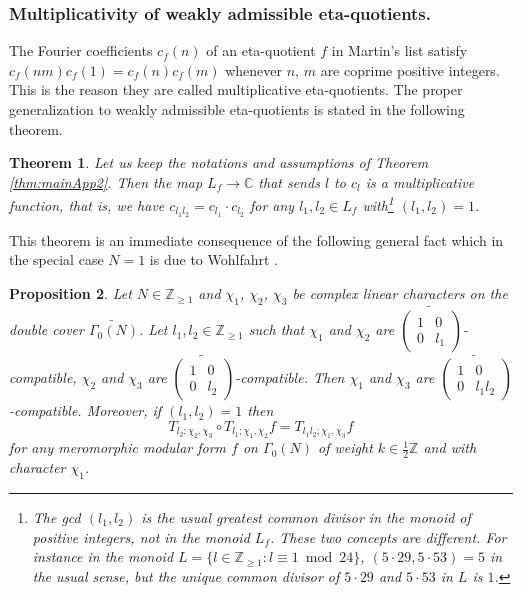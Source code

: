 \documentclass[12pt]{amsart}
\numberwithin{equation}{section}
\theoremstyle{plain}
\newtheorem{thm}{Theorem}[section]
\newtheorem{prop}[thm]{Proposition}
\theoremstyle{definition}
\theoremstyle{remark}
\newcommand\tbtmat[4]{\left(\begin{smallmatrix}{#1} & {#2} \\ {#3} & {#4}\end{smallmatrix}\right)}
\newcommand\numZ{\mathbb{Z}}
\newcommand\numC{\mathbb{C}}
\newcommand\numgeq[2]{\mathbb{#1}_{\geq #2}}
\begin{document}
\subsubsection{Multiplicativity of weakly admissible eta-quotients.} The Fourier coefficients $c_f(n)$ of an eta-quotient $f$ in Martin's list \cite[Table I]{Mar96} satisfy $c_f(nm)c_f(1)=c_f(n)c_f(m)$ whenever $n$, $m$ are coprime positive integers. This is the reason they are called multiplicative eta-quotients. The proper generalization to weakly admissible eta-quotients is stated in the following theorem.
\begin{thm}
\label{thm:multiplicativeEtaQuotients}
Let us keep the notations and assumptions of Theorem \ref{thm:mainApp2}. Then the map $L_f\rightarrow\numC$ that sends $l$ to $c_l$ is a multiplicative function, that is, we have $c_{l_1l_2}=c_{l_1}\cdot c_{l_2}$ for any $l_1,l_2\in L_f$ with\footnote{The gcd $(l_1,l_2)$ is the usual greatest common divisor in the monoid of positive integers, \emph{not} in the monoid $L_f$. These two concepts are different. For instance in the monoid $L=\{l\in\numgeq{Z}{1}\colon l\equiv1\bmod{24}\}$, $(5\cdot29,5\cdot53)=5$ in the usual sense, but the unique common divisor of $5\cdot29$ and $5\cdot53$ in $L$ is $1$.} $(l_1,l_2)=1$.
\end{thm}
This theorem is an immediate consequence of the following general fact which in the special case $N=1$ is due to Wohlfahrt \cite{Woh57}.
\begin{prop}
\label{prop:compositionTl}
Let $N\in\numgeq{Z}{1}$ and $\chi_1$, $\chi_2$, $\chi_3$ be complex linear characters on the double cover $\widetilde{\Gamma_0(N)}$. Let $l_1,l_2\in\numgeq{Z}{1}$ such that $\chi_1$ and $\chi_2$ are $\widetilde{\tbtmat{1}{0}{0}{l_1}}$-compatible, $\chi_2$ and $\chi_3$ are $\widetilde{\tbtmat{1}{0}{0}{l_2}}$-compatible. Then $\chi_1$ and $\chi_3$ are $\widetilde{\tbtmat{1}{0}{0}{l_1l_2}}$-compatible. Moreover, if $(l_1,l_2)=1$ then
\begin{equation}
\label{eq:Tl1l2Multiplicative}
T_{l_2;\chi_2,\chi_3}\circ T_{l_1;\chi_1,\chi_2}f=T_{l_1l_2;\chi_1,\chi_3}f
\end{equation}
for any meromorphic modular form $f$ on $\Gamma_0(N)$ of weight $k\in\frac{1}{2}\numZ$ and with character $\chi_1$.
\end{prop}
\end{document}
